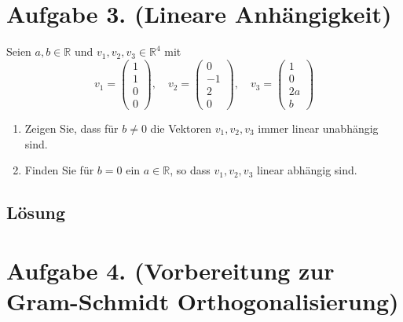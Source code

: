 \documentclass[german,12pt]{homework}
\newcommand{\RR}{\mathbb{R}}
\begin{document}
    \section*{Aufgabe 3. (Lineare Anhängigkeit)}

    \begin{problem}
        Seien \(a, b \in \RR\) und \(v_1, v_2, v_3 \in \RR^4\) mit
        \[v_1 = \begin{pmatrix}1\\1\\0\\0\end{pmatrix}, \quad v_2 = \begin{pmatrix}0\\-1\\2\\0\end{pmatrix}, \quad v_3 = \begin{pmatrix}1\\0\\2a\\b\end{pmatrix}\]
        \begin{enumerate}
          \item Zeigen Sie, dass für \(b \ne 0\) die Vektoren \(v_1, v_2, v_3\) immer linear unabhängig sind.
          \item Finden Sie für \(b = 0\) ein \(a \in \RR\), so dass \(v_1, v_2, v_3\) linear abhängig sind.
        \end{enumerate}
    \end{problem}

    \subsection*{Lösung}

    \section*{Aufgabe 4. (Vorbereitung zur Gram-Schmidt Orthogonalisierung)}
\end{document}

